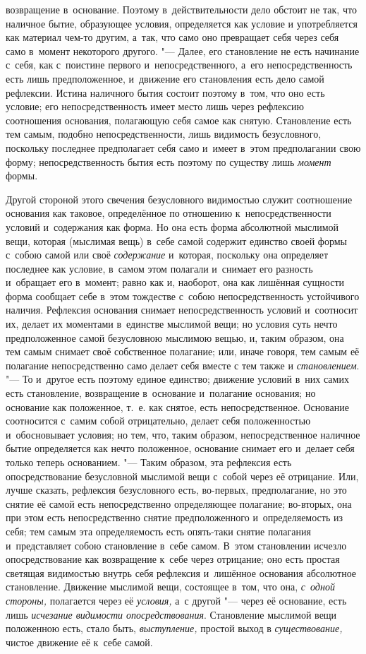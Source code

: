 возвращение в~основание. Поэтому в~действительности дело обстоит не так,
что наличное бытие, образующее условия, определяется как условие и
употребляется как материал чем-то другим, а~так, что само оно превращает
себя через себя само в~момент некоторого другого. "--- Далее, его становление
не есть начинание с~себя, как с~поистине первого и~непосредственного, а~его
непосредственность есть лишь предположенное, и~движение его становления
есть дело самой рефлексии. Истина наличного бытия состоит поэтому в~том,
что оно есть условие; его непосредственность имеет место лишь через
рефлексию соотношения основания, полагающую себя самое как снятую.
Становление есть тем самым, подобно непосредственности, лишь видимость
безусловного, поскольку последнее предполагает себя само и~имеет в~этом
предполагании свою форму; непосредственность бытия есть поэтому по существу
лишь {\em момент} формы.

Другой стороной этого свечения безусловного видимостью служит соотношение
основания как таковое, определённое по отношению к~непосредственности
условий и~содержания как форма. Но она есть форма абсолютной мыслимой вещи,
которая (мыслимая вещь) в~себе самой содержит единство своей формы с~собою
самой или своё {\em содержание} и~которая, поскольку
она определяет последнее как условие, в~самом этом полагали и~снимает его
разность и~обращает его в~момент; равно как и, наоборот, она как лишённая
сущности форма сообщает себе в~этом тождестве с~собою непосредственность
устойчивого наличия. Рефлексия основания снимает непосредственность условий
и~соотносит их, делает их моментами в~единстве мыслимой вещи; но условия
суть нечто предположенное самой безусловною мыслимою вещью, и, таким
образом, она тем самым снимает своё собственное полагание; или, иначе
говоря, тем самым её полагание непосредственно само делает себя вместе с
тем также и {\em становлением}. "--- То и~другое есть
поэтому единое единство; движение условий в~них самих есть становление,
возвращение в~основание и~полагание основания; но основание как положенное,
т.~е. как снятое, есть непосредственное. Основание соотносится с~самим
собой отрицательно, делает себя положенностью и~обосновывает условия; но
тем, что, таким образом, непосредственное наличное бытие определяется как
нечто положенное, основание снимает его и~делает себя только теперь
основанием. "--- Таким образом, эта рефлексия есть опосредствование
безусловной мыслимой вещи с~собой через её отрицание. Или, лучше сказать,
рефлексия безусловного есть, во-первых, предполагание, но это снятие её
самой есть непосредственно определяющее полагание; во-вторых, она при этом
есть непосредственно снятие предположенного и~определяемость из себя; тем
самым эта определяемость есть опять-таки снятие полагания и~представляет
собою становление в~себе самом. В~этом становлении исчезло опосредствование
как возвращение к~себе через отрицание; оно есть простая светящая
видимостью внутрь себя рефлексия и~лишённое основания абсолютное
становление. Движение мыслимой вещи, состоящее в~том, что она,
{\em с~одной стороны,} полагается через её
{\em условия,} а~с другой "--- через её основание, есть
лишь {\em исчезание видимости опосредствования}.
Становление мыслимой вещи положенною есть, стало быть,
{\em выступление,} простой выход в
{\em существование,} чистое движение её к~себе самой.

